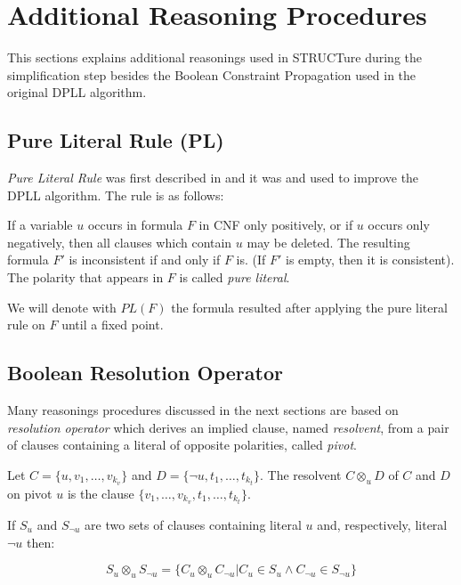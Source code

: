 \section{Additional Reasoning Procedures}

This sections explains additional reasonings used in STRUCTure during
the simplification step besides the Boolean Constraint Propagation
used in the original DPLL algorithm.

\subsection{Pure Literal Rule (PL)}
\label{ssec:pl}

\emph{Pure Literal Rule} was first described in
\cite{Davis:1960:CPQ:321033.321034} and it was and used to improve
the DPLL algorithm. The rule is as follows:

\begin{mydef}
  If a variable $u$ occurs in formula $F$ in CNF only positively, or
  if $u$ occurs only negatively, then all clauses which contain $u$
  may be deleted. The resulting formula $F'$ is inconsistent
  if and only if $F$ is. (If $F'$ is empty, then it is consistent).
  The polarity that appears in $F$ is called \emph{pure literal}.
\end{mydef}

We will denote with $PL(F)$ the formula resulted after applying
the pure literal rule on $F$ until a fixed point.


\subsection{Boolean Resolution Operator}
\label{ssec:resolution}

Many reasonings procedures discussed in the next sections are based
on \emph{resolution operator} \cite{Robinson:1965:MLB:321250.321253}
which derives an implied clause, named \emph{resolvent}, from
a pair of clauses containing a literal of opposite polarities,
called \emph{pivot}.

\begin{mydef}
  \label{mydef:resolution}
  Let $C = \{ u, v_1, \ldots, v_{k_v} \}$ and $D = \{ \neg u,
  t_1, \ldots, t_{k_t} \}$. The resolvent $C \otimes_{u} D$ of $C$
  and $D$ on pivot $u$ is the clause $\{v_1, \ldots, v_{k_v}, t_1,
  \ldots, t_{k_t}\}$.
\end{mydef}

\begin{mydef}
  If $S_u$ and $S_{\neg u}$ are two sets of clauses containing
  literal $u$ and, respectively, literal $\neg u$ then:

  $$S_u \otimes_{u} S_{\neg u} = \{ C_u \otimes_{u} C_{\neg u} |
  C_u \in S_u \land C_{\neg u} \in S_{\neg u}\}$$
\end{mydef}

